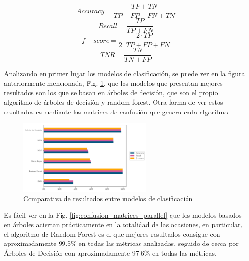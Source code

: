 \begin{multicols}{2}
\begin{equation}
    Accuracy = \frac{TP + TN}{TP + FP + FN + TN}
    \label{eq:accur}
\end{equation}
\begin{equation}
    Recall = \frac{TP}{TP + FN}
    \label{eq:recall}
\end{equation}
\begin{equation}
    f-score = \frac{2 \cdot TP}{2 \cdot TP + FP + FN}
\end{equation}
\begin{equation}
    TNR = \frac{TN}{TN + FP}
    \label{eq:tnr}
\end{equation}
\end{multicols}

Analizando en primer lugar los modelos de clasificación, se puede ver en la figura anteriormente mencionada, Fig. \ref{fig:comp_accur}, que los modelos que presentan mejores resultados son los que se basan en árboles de decisión, que son el propio algoritmo de árboles de decisión y random forest. Otra forma de ver estos resultados es mediante las matrices de confusión que genera cada algoritmo.

\begin{figure}[htpb!]
    \centering
    \includegraphics[width=0.6\textwidth]{../Python/plots/parallel/model_results}
    \caption{Comparativa de resultados entre modelos de clasificación}
    \label{fig:comp_accur}
\end{figure}

Es fácil ver en la Fig. \ref{fig:confusion_matrices_parallel} que los modelos basados en árboles aciertan prácticamente en la totalidad de las ocasiones, en particular, el algoritmo de Random Forest es el que mejores resultados consigue con aproximadamente 99.5\% en todas las métricas analizadas, seguido de cerca por Árboles de Decisión con aproximadamente 97.6\% en todas las métricas.


